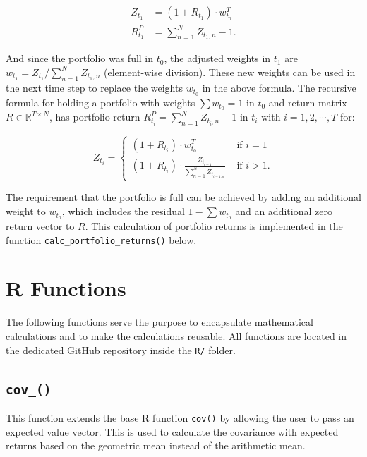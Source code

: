 \documentclass[
  oneside, a4paper, 12pt, openany]{book}
\theoremstyle{definition}
\theoremstyle{definition}
\theoremstyle{definition}
\theoremstyle{definition}
\theoremstyle{remark}
\begin{document}
\begin{align*}
  Z_{t_1} &= (1+R_{t_1}) \cdot w_{t_0}^T\\
  R_{t_1}^P &= \sum_{n = 1}^N Z_{t_1, n} - 1.
\end{align*}

And since the portfolio was full in \(t_0\), the adjusted weights in \(t_1\) are \(w_{t_1} = Z_{t_1}/\sum_{n = 1}^N Z_{t_1, n}\) (element-wise division). These new weights can be used in the next time step to replace the weights \(w_{t_0}\) in the above formula. The recursive formula for holding a portfolio with weights \(\textstyle\sum w_{t_0} = 1\) in \(t_0\) and return matrix \(R \in \mathbb{R}^{T \times N}\), has portfolio return \(R_{t_i}^P = \textstyle\sum_{n = 1}^N Z_{t_i, n} - 1\) in \(t_i\) with \(i=1, 2, \cdots, T\) for:

\[
  Z_{t_i} =
  \begin{cases}
  (1+R_{t_i})\cdot w_{t_0}^T &\text{ if }i=1\\
  (1+R_{t_i})\cdot \frac{Z_{t_{i-1}}}{\sum_{n = 1}^N Z_{t_{i-1, n}}} &\text{ if }i>1.
  \end{cases}
\]

The requirement that the portfolio is full can be achieved by adding an additional weight to \(w_{t_0}\), which includes the residual \(1-\textstyle\sum w_{t_0}\) and an additional zero return vector to \(R\). This calculation of portfolio returns is implemented in the function \texttt{calc\_portfolio\_returns()} below.

\hypertarget{r-functions-2}{%
\section{R Functions}\label{r-functions-2}}

The following functions serve the purpose to encapsulate mathematical calculations and to make the calculations reusable. All functions are located in the dedicated GitHub repository inside the \texttt{R/} folder.

\hypertarget{covfun}{%
\subsection{\texorpdfstring{\texttt{cov\_()}}{cov\_()}}\label{covfun}}

This function extends the base R function \texttt{cov()} by allowing the user to pass an expected value vector. This is used to calculate the covariance with expected returns based on the geometric mean instead of the arithmetic mean.
\end{document}
